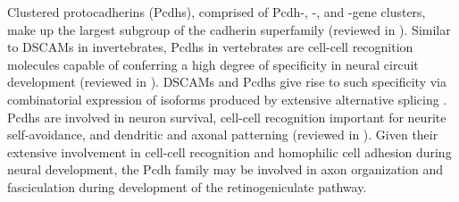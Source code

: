 Clustered protocadherins (Pcdhs), comprised of Pcdh-\alpha, -\beta, and -\gamma gene clusters, make up the largest subgroup of the cadherin superfamily (reviewed in ).
Similar to DSCAMs in invertebrates, Pcdhs in vertebrates are cell-cell recognition molecules capable of conferring a high degree of specificity in neural circuit development (reviewed in ).
DSCAMs and Pcdhs give rise to such specificity via combinatorial expression of isoforms produced by extensive alternative splicing \cite{zipursky2010chemoaffinity}.
Pcdhs are involved in neuron survival, cell-cell recognition important for neurite self-avoidance, and dendritic and axonal patterning (reviewed in ).
Given their extensive involvement in cell-cell recognition and homophilic cell adhesion during neural development, the Pcdh family may be involved in axon organization and fasciculation during development of the retinogeniculate pathway.
